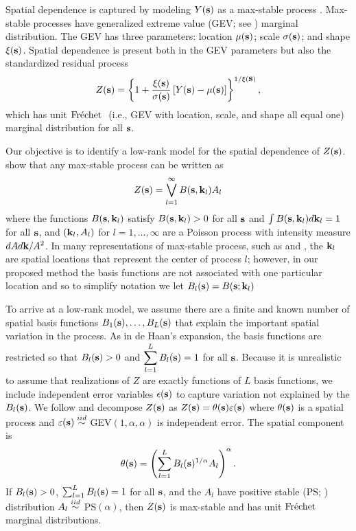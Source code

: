 \documentclass[11pt]{article}
\begin{document}
Spatial dependence is captured by modeling $Y(\mbox{\bf s})$ as a max-stable process \citep{deHaan2006}.
Max-stable processes have generalized extreme value (GEV; see ) marginal distribution.
The GEV has three parameters: location $\mu(\mbox{\bf s})$; scale $\sigma(\mbox{\bf s})$; and shape $\xi(\mbox{\bf s})$.
Spatial dependence is present both in the GEV parameters but also the standardized residual process
\begin{align} \label{ebeq:Y2Z}
 Z(\mbox{\bf s}) = \left\{1+\frac{\xi(\mbox{\bf s})}{\sigma(\mbox{\bf s})}\left[Y(\mbox{\bf s}) - \mu(\mbox{\bf s})\right]\right\}^{1/\xi(\mbox{\bf s})},
\end{align}
which has unit $\mbox{Fr$\acute{\mbox{e}}$chet }$ (i.e., GEV with location, scale, and shape all equal one) marginal distribution for all $\mbox{\bf s}$.

Our objective is to identify a low-rank model for the spatial dependence of $Z(\mbox{\bf s})$.
 show that any max-stable process can be written as
\begin{align} \label{ebeq:spectral}
  Z(\mbox{\bf s}) = \bigvee_{l = 1}^{\infty} B(\mbox{\bf s}, \mbox{\bf k}_l)A_{l}
\end{align}
where the functions $B(\mbox{\bf s}, \mbox{\bf k}_l)$ satisfy $B(\mbox{\bf s}, \mbox{\bf k}_l) > 0$ for all $\mbox{\bf s}$ and $\int B(\mbox{\bf s}, \mbox{\bf k}_l) d\mbox{\bf k}_l = 1$ for all $\mbox{\bf s}$, and $(\mbox{\bf k}_l, A_l)$ for $l=1,\ldots,\infty$ are a Poisson process with intensity measure $dA d\mbox{\bf k}/A^2$.
In many representations of max-stable process, such as \citet{Smith1990} and \citet{Reich2012}, the $\mbox{\bf k}_l$ are spatial locations that represent the center of process $l$; however, in our proposed method the basis functions are not associated with one particular location and so to simplify notation we let $B_l(\mbox{\bf s}) = B(\mbox{\bf s}; \mbox{\bf k}_l)$

To arrive at a low-rank model, we assume there are a finite and known number of spatial basis functions $B_1(\mbox{\bf s}), \ldots, B_L(\mbox{\bf s})$ that explain the important spatial variation in the process.
As in de Haan's expansion, the basis functions are restricted so that $B_l(\mbox{\bf s}) > 0$ and $\displaystyle \sum_{l = 1}^L B_l(\mbox{\bf s}) = 1$ for all $\mbox{\bf s}$.
Because it is unrealistic to assume that realizations of $Z$ are exactly functions of $L$ basis functions, we include independent error variables $\epsilon(\mbox{\bf s})$ to capture variation not explained by the $B_l(\mbox{\bf s})$.
We follow \citet{Reich2012} and decompose $Z(\mbox{\bf s})$ as $Z(\mbox{\bf s})=\theta(\mbox{\bf s})\varepsilon(\mbox{\bf s})$ where $\theta(\mbox{\bf s})$ is a spatial process and $\varepsilon(\mbox{\bf s})\stackrel{iid}{\sim}$ GEV$(1,\alpha,\alpha)$ is independent error.
The spatial component is
\begin{align} \label{ebeq:theta}
  \theta(\mbox{\bf s}) = \left(\sum_{l=1}^LB_{l}(\mbox{\bf s})^{1/\alpha}A_{l}\right)^{\alpha}.
\end{align}
If $B_{l}(\mbox{\bf s})>0$, $\sum_{l=1}^LB_{l}(\mbox{\bf s})=1$ for all $\mbox{\bf s}$, and the $A_{l}$ have positive stable (PS; ) distribution $A_{l}\stackrel{iid}{\sim}$ PS$(\alpha)$, then $Z(\mbox{\bf s})$ is max-stable and has unit $\mbox{Fr$\acute{\mbox{e}}$chet }$ marginal distributions.
\end{document}
